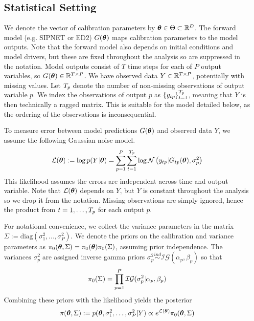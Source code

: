 \documentclass[12pt]{article}
\begin{document}
\subsection{Statistical Setting}
We denote the vector of calibration parameters by $\boldsymbol{\theta} \in \Theta \subset \mathbb{R}^{D}$. The forward model (e.g. SIPNET or ED2) $G(\boldsymbol{\theta})$ maps calibration parameters to the model outputs. Note that the forward 
model also depends on initial conditions and model drivers, but these are fixed throughout the analysis so are suppressed in the notation. Model outputs consist 
of $T$ time steps for each of $P$ output variables, so $G(\boldsymbol{\theta}) \in \mathbb{R}^{T \times P}$. We have observed data $Y \in \mathbb{R}^{T \times P}$, potentially with missing values. Let $T_{p}$ denote the number 
of non-missing observations of output variable $p$. We index the observations of output $p$ as $\{y_{tp}\}_{t = 1}^{T_{p}}$, meaning that $Y$ is then technically a ragged matrix. 
This is suitable for the model detailed below, as the ordering of the observations is inconsequential. 

To measure error between model 
predictions $G(\boldsymbol{\theta})$ and observed data $Y$, we assume the following Gaussian noise model. 
\begin{align*}
\mathcal{L}(\boldsymbol{\theta}) := \log p(Y|\mathbf{\boldsymbol{\theta}}) = \sum_{p = 1}^{P} \sum_{t = 1}^{T_{p}} \log \mathcal{N}\left(y_{tp}| G_{tp}(\boldsymbol{\theta}), \sigma_p^2 \right)
\end{align*}
This likelihood assumes the errors are independent across time and output variable. Note that $\mathcal{L}(\boldsymbol{\theta})$ depends on $Y$, but $Y$ is constant throughout the analysis so we drop it from the notation. Missing 
observations are simply ignored, hence the product from $t = 1, \dots, T_{p}$ for each output $p$.

For notational convenience, we collect the variance parameters in the matrix $\Sigma := \text{diag}\left(\sigma_1^2, \dots, \sigma_P^2 \right)$. 
We denote the priors on the calibration and variance parameters as  $\pi_0(\boldsymbol{\theta}, \Sigma) = \pi_0(\boldsymbol{\theta})\pi_0(\Sigma)$, assuming prior independence.  
The variances $\sigma_p^2$ are assigned inverse gamma priors $\sigma_p^2 \overset{ind}{\sim} \mathcal{IG}(\alpha_p, \beta_p)$ so that 
\[\pi_0(\Sigma) = \prod_{p = 1}^{P} \mathcal{IG}(\sigma_p^2|\alpha_p, \beta_p)\]
Combining these priors with the likelihood yields the posterior 
\[\pi(\boldsymbol{\theta}, \Sigma) := p(\boldsymbol{\theta}, \sigma_1^2, \dots, \sigma_P^2|Y) \propto e^{\mathcal{L}(\boldsymbol{\theta})}\pi_0(\boldsymbol{\theta}, \Sigma)\]
\end{document}
